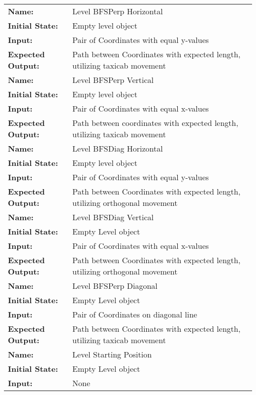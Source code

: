 \documentclass[12pt, titlepage]{article}
\begin{document}
\begin{center}
\begin{longtable}{ l | p{10cm} }
				\hline
				\rule{0pt}{1.5em}\textbf{Name:} & Level BFSPerp Horizontal\\
				\textbf{Initial State:} & Empty level object\\
				\textbf{Input:} & Pair of Coordinates with equal y-values\\
				\textbf{Expected Output:} & Path between Coordinates with expected length, utilizing taxicab movement\\[0.6em]
				\hline
				\rule{0pt}{1.5em}\textbf{Name:} & Level BFSPerp Vertical\\
				\textbf{Initial State:} & Empty level object\\
				\textbf{Input:} & Pair of Coordinates with equal x-values\\
				\textbf{Expected Output:} & Path between coordinates with expected length, utilizing taxicab movement\\[0.6em]
				\hline
				\rule{0pt}{1.5em}\textbf{Name:} & Level BFSDiag Horizontal\\
				\textbf{Initial State:} & Empty level object\\
				\textbf{Input:} & Pair of Coordinates with equal y-values\\
				\textbf{Expected Output:} & Path between Coordinates with expected length, utilizing orthogonal movement\\[0.6em]
				\hline
				\rule{0pt}{1.5em}\textbf{Name:} & Level BFSDiag Vertical\\
				\textbf{Initial State:} & Empty Level object\\
				\textbf{Input:} & Pair of Coordinates with equal x-values\\
				\textbf{Expected Output:} & Path between Coordinates with expected length, utilizing orthogonal movement\\[0.6em]
				\hline
				\rule{0pt}{1.5em}\textbf{Name:} & Level BFSPerp Diagonal\\
				\textbf{Initial State:} & Empty Level object\\
				\textbf{Input:} & Pair of Coordinates on diagonal line\\
				\textbf{Expected Output:} & Path between Coordinates with expected length, utilizing taxicab movement\\[0.6em]
				\hline
				\rule{0pt}{1.5em}\textbf{Name:} & Level Starting Position\\
				\textbf{Initial State:} & Empty Level object\\
				\textbf{Input:} & None\\

\end{longtable}
\end{center}
\end{document}
